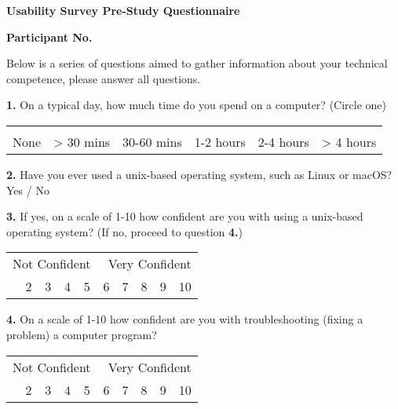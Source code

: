 \begin{center}
	\textbf{Usability Survey Pre-Study Questionnaire}\par
	\textbf{Participant No.}\par
\end{center}

Below is a series of questions aimed to gather information about your technical competence, please answer all questions.

\vspace{0.5cm}

\textbf{1.} On a typical day, how much time do you spend on a computer? (Circle one)
\begin{center}
	\begin{table}[h]
	\begin{tabularx}{\textwidth}{XXXXXX}
	\multicolumn{6}{l}{} \\
	\centering
	None & > 30 mins & 30-60 mins & 1-2 hours & 2-4 hours & > 4 hours \\
	\end{tabularx}
	\end{table}
\end{center}

\textbf{2.} Have you ever used a unix-based operating system, such as Linux or macOS? \tab Yes / No

\vspace{0.5cm}

\textbf{3.} If yes, on a scale of 1-10 how confident are you with using a unix-based operating system? (If no, proceed to question \textbf{4.})

\begin{center}
	\begin{table}[h]
	\begin{tabularx}{\textwidth}{XXXXXXXXXX}
	\multicolumn{5}{l}{Not Confident} & \multicolumn{5}{r}{Very Confident} \\
	\centering
	1    & 2    & 3    & 4    & 5    & 6    & 7    & 8    & 9    & 10
	\end{tabularx}
	\end{table}
\end{center}

\textbf{4.} On a scale of 1-10 how confident are you with troubleshooting (fixing a problem) a computer program?

\begin{center}
	\begin{table}[h]
	\begin{tabularx}{\textwidth}{XXXXXXXXXX}
	\multicolumn{5}{l}{Not Confident} & \multicolumn{5}{r}{Very Confident} \\
	\centering
	1    & 2    & 3    & 4    & 5    & 6    & 7    & 8    & 9    & 10
	\end{tabularx}
	\end{table}
\end{center}

